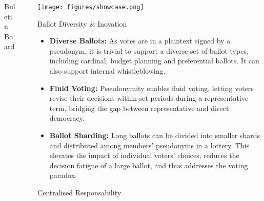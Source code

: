 \documentclass[final]{beamer}
\newlength{\sepwidth}
\newlength{\colwidth}
\newcommand{\separatorcolumn}{\begin{column}{\sepwidth}\end{column}}
\begin{document}
\begin{frame}[t]
\begin{columns}[t]
\begin{column}{\colwidth}
\begin{block}{Buletin Board}
\begin{itemize}
 \end{itemize}
    
\end{block}

\end{column}

\separatorcolumn

\begin{column}{\colwidth}

  \fontsize{19pt}{22pt}\selectfont

  \vspace{-2cm}
  \texttt{[image: figures/showcase.png]}

  \begin{block}{Ballot Diversity \& Inovation}

    \begin{itemize}
    \item \textbf{Diverse Ballots:} As votes are in a plaintext signed by a pseudonym, it is trivial to support a diverse set of ballot types, including cardinal, budget planning and preferential ballots. It can also support internal whistleblowing.
    \item \textbf{Fluid Voting:} Pseudonymity enables fluid voting, letting voters revise their decisions within set periods during a representative term, bridging the gap between representative and direct democracy.
    \item \textbf{Ballot Sharding:} Long ballots can be divided into smaller shards and distributed among members' pseudonyms in a lottery. This elevates the impact of individual voters' choices, reduces the decision fatigue of a large ballot, and thus addresses the voting paradox.
    \end{itemize}
  \end{block}

  \begin{block}{Centralised Responsability}


\end{block}
\end{column}
\end{columns}
\end{frame}
\end{document}
